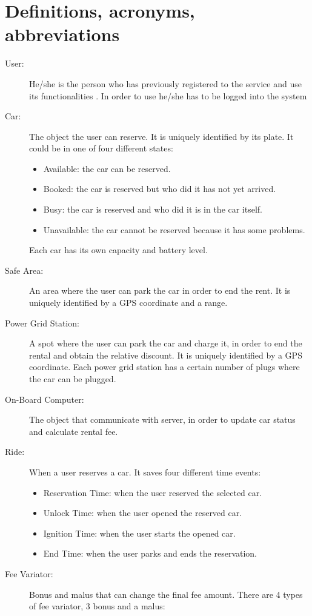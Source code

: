 \section{Definitions, acronyms, abbreviations}
\begin{description}
	\item [User:] He/she is the person who has previously registered to the service and use its functionalities . In order to use he/she has to be logged into the system
	\item [Car:] The object the user can reserve. It is uniquely identified by its plate. It could be in one of four different states:
	\begin{itemize}
		\item Available: the car can be reserved.
		\item Booked: the car is reserved but who did it has not yet arrived.
		\item Busy: the car is reserved and who did it is in the car itself.
		\item Unavailable: the car cannot be reserved because it has some problems.
	\end{itemize}
	Each car has its own capacity and battery level.
	\item [Safe Area:] An area where the user can park the car in order to end the rent. It is uniquely identified by a GPS coordinate and a range.
	\item [Power Grid Station:] A spot where the user can park the car and charge it, in order to end the rental and obtain the relative discount. It is uniquely identified by a GPS coordinate. Each power grid station has a certain number of plugs where the car can be plugged.
	\item [On-Board Computer:] The object that communicate with server, in order to update car status and calculate rental fee.
	\item [Ride:] When a user reserves a car. It saves four different time events:
	\begin{itemize}
		\item Reservation Time: when the user reserved the selected car.
		\item Unlock Time: when the user opened the reserved car.
		\item Ignition Time: when the user starts the opened car.
		\item End Time: when the user parks and ends the reservation.
	\end{itemize}
	\item [Fee Variator:] Bonus and malus that can change the final fee amount. There are 4 types of fee variator, 3 bonus and a malus:

\end{description}
